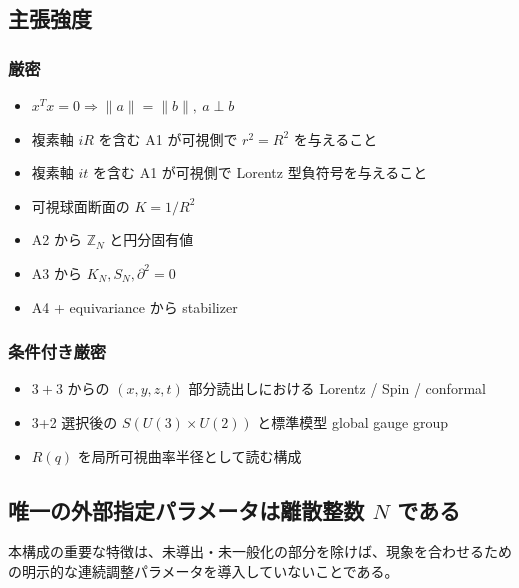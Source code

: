 \documentclass[
  a4paper,
]{ltjsarticle}
\providecommand{\tightlist}{%
  \setlength{\itemsep}{0pt}\setlength{\parskip}{0pt}}
\begin{document}
\subsection{主張強度}\label{ux4e3bux5f35ux5f37ux5ea6}

\subsubsection{厳密}\label{ux53b3ux5bc6}

\begin{itemize}
\tightlist
\item
  \(x^Tx=0\Rightarrow \|a\|=\|b\|,\ a\perp b\)
\item
  複素軸 \(iR\) を含む A1 が可視側で \(r^2=R^2\) を与えること
\item
  複素軸 \(it\) を含む A1 が可視側で Lorentz 型負符号を与えること
\item
  可視球面断面の \(K=1/R^2\)
\item
  A2 から \(\mathbb Z_N\) と円分固有値
\item
  A3 から \(K_N,S_N,\partial^2=0\)
\item
  A4 + equivariance から stabilizer
\end{itemize}

\subsubsection{条件付き厳密}\label{ux6761ux4ef6ux4ed8ux304dux53b3ux5bc6}

\begin{itemize}
\tightlist
\item
  \(3+3\) からの \((x,y,z,t)\) 部分読出しにおける Lorentz / Spin /
  conformal
\item
  3+2 選択後の \(S(U(3)\times U(2))\) と標準模型 global gauge group
\item
  \(R(q)\) を局所可視曲率半径として読む構成
\end{itemize}

\subsection{\texorpdfstring{唯一の外部指定パラメータは離散整数 \(N\)
である}{唯一の外部指定パラメータは離散整数 N である}}\label{ux552fux4e00ux306eux5916ux90e8ux6307ux5b9aux30d1ux30e9ux30e1ux30fcux30bfux306fux96e2ux6563ux6574ux6570-n-ux3067ux3042ux308b}

本構成の重要な特徴は、未導出・未一般化の部分を除けば、現象を合わせるための明示的な連続調整パラメータを導入していないことである。
\end{document}
